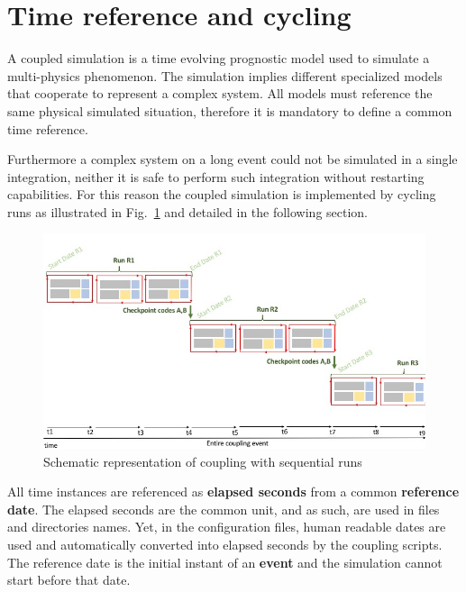 \documentclass[Coupling]{../../data/TelemacDoc} %
\begin{document}
\section{Time reference and cycling}\label{namcon:TIMECYCLE}
A coupled simulation is a time evolving prognostic model used to
simulate a multi-physics phenomenon. The simulation implies different
specialized models that cooperate to represent a complex system. All
models must reference the same physical simulated situation,
therefore it is mandatory to define a common time reference.

Furthermore a complex system on a long event could not be
simulated in a single integration, neither it is safe to perform such
integration without restarting capabilities. For this reason the
coupled simulation is implemented by cycling runs as
illustrated in Fig.~\ref{fig:schemacoupling_time3} and detailed in the following section.

\begin{figure}[htbp]
    \centering
        \centering \includegraphics[width=12cm]{figures/schemacoupling_time3.jpeg}
    \caption{Schematic representation of coupling with sequential runs  }\label{fig:schemacoupling_time3}
\end{figure}

All time instances are referenced as {\bf elapsed seconds}
from a common {\bf reference date}. The elapsed seconds are the common unit, and as such, are used in files
and directories names. Yet, in the configuration files, human readable
dates are used and automatically converted into 
elapsed seconds by the coupling scripts. The reference date is the initial instant of an
{\bf event} and the simulation cannot start before that date. 
\end{document}
